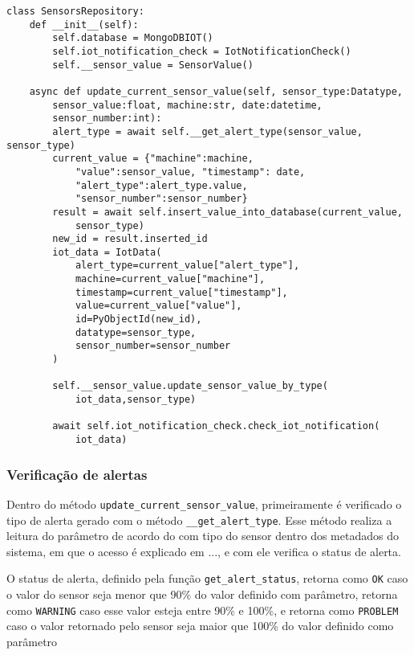 \begin{verbatim}
class SensorsRepository:
    def __init__(self):
        self.database = MongoDBIOT()
        self.iot_notification_check = IotNotificationCheck()
        self.__sensor_value = SensorValue()

    async def update_current_sensor_value(self, sensor_type:Datatype,
        sensor_value:float, machine:str, date:datetime, 
        sensor_number:int):
        alert_type = await self.__get_alert_type(sensor_value, sensor_type)
        current_value = {"machine":machine,
            "value":sensor_value, "timestamp": date,
            "alert_type":alert_type.value,
            "sensor_number":sensor_number}
        result = await self.insert_value_into_database(current_value, 
            sensor_type)
        new_id = result.inserted_id
        iot_data = IotData(
            alert_type=current_value["alert_type"],
            machine=current_value["machine"],
            timestamp=current_value["timestamp"],
            value=current_value["value"],
            id=PyObjectId(new_id),
            datatype=sensor_type,
            sensor_number=sensor_number
        )
        
        self.__sensor_value.update_sensor_value_by_type(
            iot_data,sensor_type)
        
        await self.iot_notification_check.check_iot_notification(
            iot_data)
\end{verbatim}

\subsubsection{Verificação de alertas}

Dentro do método \texttt{update\_current\_sensor\_value}, primeiramente é verificado o tipo de alerta gerado com o método  \texttt{\_\_get\_alert\_type}.
Esse método realiza a leitura do parâmetro de acordo do com tipo do sensor dentro dos metadados do sistema, em que o acesso é explicado em ..., e com ele verifica o status de alerta. 

O status de alerta, definido pela função  \texttt{get\_alert\_status}, retorna como \texttt{OK} caso o valor do sensor seja menor que 90\% do valor definido com parâmetro, retorna como \texttt{WARNING} caso esse valor esteja entre 90\% e 100\%, e retorna como \texttt{PROBLEM} caso o valor retornado pelo sensor seja maior que 100\% do valor definido como parâmetro


